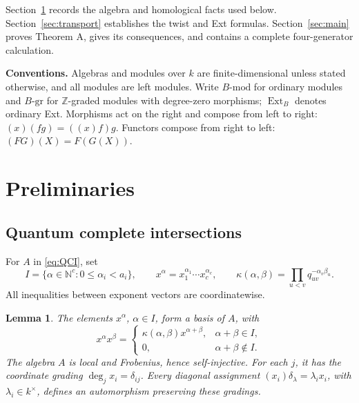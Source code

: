 \documentclass[10pt,a4paper]{amsart}
\numberwithin{equation}{section}
\newtheorem{lemma}[definition]{Lemma}
\DeclareMathOperator{\Ext}{Ext}
\newcommand{\Z}{\mathbb Z}
\newcommand{\N}{\mathbb N}
\newcommand{\gmod}[1]{#1\text{-}\mathrm{gr}}
\newcommand{\umod}[1]{#1\text{-}\mathrm{mod}}
\begin{document}
Section~\ref{sec:prelim} records the algebra and homological facts used
below. Section~\ref{sec:transport} establishes the twist and Ext formulas.
Section~\ref{sec:main} proves Theorem A, gives its consequences, and
contains a complete four-generator calculation.

\medskip\noindent\textbf{Conventions.}
Algebras and modules over \(k\) are finite-dimensional unless stated
otherwise, and all modules are left modules. Write \(\umod{B}\) for
ordinary modules and \(\gmod{B}\) for \(\Z\)-graded modules with
degree-zero morphisms; \(\Ext_B\) denotes ordinary Ext. Morphisms act on
the right and compose from left to right:
\((x)(fg)=((x)f)g\). Functors compose from right to left:
\((FG)(X)=F(G(X))\).

\section{Preliminaries}\label{sec:prelim}

\subsection{Quantum complete intersections}

For \(A\) in \eqref{eq:QCI}, set
\[
 I=\{\alpha\in\N^c:0\leq\alpha_i<a_i\},\qquad
 x^\alpha=x_1^{\alpha_1}\cdots x_c^{\alpha_c},\qquad
 \kappa(\alpha,\beta)=\prod_{u<v}q_{uv}^{-\alpha_v\beta_u}.
\]
All inequalities between exponent vectors are coordinatewise.

\begin{lemma}\label{lem:structure}
The elements \(x^\alpha\), \(\alpha\in I\), form a basis of \(A\), with
\begin{equation}\label{eq:PBWproduct}
 x^\alpha x^\beta=
 \begin{cases}
 \kappa(\alpha,\beta)x^{\alpha+\beta},&\alpha+\beta\in I,\\
 0,&\alpha+\beta\notin I.
 \end{cases}
\end{equation}
The algebra \(A\) is local and Frobenius, hence self-injective.
For each \(j\), it has the coordinate grading
\(\deg_jx_i=\delta_{ij}\). Every diagonal assignment
\((x_i)\delta_\lambda=\lambda_i x_i\), with \(\lambda_i\in k^\times\),
defines an automorphism preserving these gradings.
\end{lemma}
\end{document}

